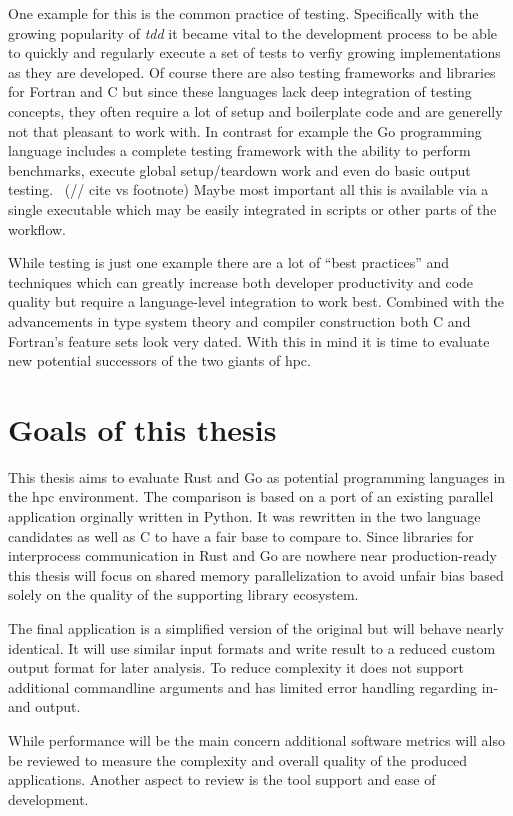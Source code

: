 One example for this is the common practice of testing. Specifically with the growing popularity of \textit{\gls{tdd}} it became vital to the development process to be able to quickly and regularly execute a set of tests to verfiy growing implementations as they are developed. Of course there are also testing frameworks and libraries for Fortran and C but since these languages lack deep integration of testing concepts, they often require a lot of setup and boilerplate code and are generelly not that pleasant to work with. In contrast for example the Go programming language includes a complete testing framework with the ability to perform benchmarks, execute global setup/teardown work and even do basic output testing.~\cite{go_doc_testing} (// cite vs footnote) Maybe most important all this is available via a single executable  which may be easily integrated in scripts or other parts of the workflow.

While testing is just one example there are a lot of ``best practices'' and techniques which can greatly increase both developer productivity and code quality but require a language-level integration to work best. Combined with the advancements in type system theory and compiler construction both C and Fortran's feature sets look very dated. With this in mind it is time to evaluate new potential successors of the two giants of \gls{hpc}.

\section{Goals of this thesis}
\label{sec:Introduction::Goals}

This thesis aims to evaluate Rust and Go as potential programming languages in the \gls{hpc} environment. The comparison is based on a port of an existing parallel application orginally written in Python. It was rewritten in the two language candidates as well as C to have a fair base to compare to. Since libraries for interprocess communication in Rust and Go are nowhere near production-ready this thesis will focus on shared memory parallelization to avoid unfair bias based solely on the quality of the supporting library ecosystem.

The final application is a simplified version of the original but will behave nearly identical. It will use similar input formats and write result to a reduced custom output format for later analysis. To reduce complexity it does not support additional commandline arguments and has limited error handling regarding in- and output.

While performance will be the main concern additional software metrics will also be reviewed to measure the complexity and overall quality of the produced applications. Another aspect to review is the tool support and ease of development.

